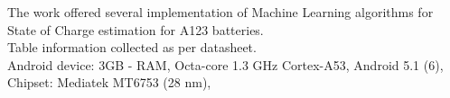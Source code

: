 The work offered several implementation of Machine Learning algorithms for State of Charge estimation for A123 batteries. \\

Table information collected as per datasheet. \\

Android device: 3GB - RAM, Octa-core 1.3 GHz Cortex-A53, Android 5.1 (6), Chipset: Mediatek MT6753 (28 nm), \\




